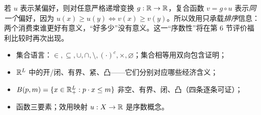 \begin{remark}[效用的序数性]
若 $u$ 表示某偏好，则对任意严格递增变换 $g:\mathbb{R}\to\mathbb{R}$，复合函数 $v=g\circ u$ 表示\emph{同一个}偏好，因为 $u(x)\ge u(y)\iff v(x)\ge v(y)$。所以效用只承载\emph{排序}信息：两个消费束谁更好有意义，“好多少”没有意义。这一“序数性”将在第 6 节评价福利比较时再次出现。
\end{remark}

\begin{itemize}
  \item 集合语言：$\in,\subseteq,\cup,\cap,\setminus,(\cdot)^{c},\times,\varnothing$；集合相等用双向包含证明；
  \item $\mathbb{R}^{L}$ 中的开/闭、有界、紧、凸——它们分别对应哪些经济含义；
  \item $B(p,m)=\{x\in\mathbb{R}_+^{L}:p\cdot x\le m\}$ 非空、有界、闭、凸（四条逐条可证）；
  \item 函数三要素；效用映射 $u:X\to\mathbb{R}$ 是序数概念。
\end{itemize}
